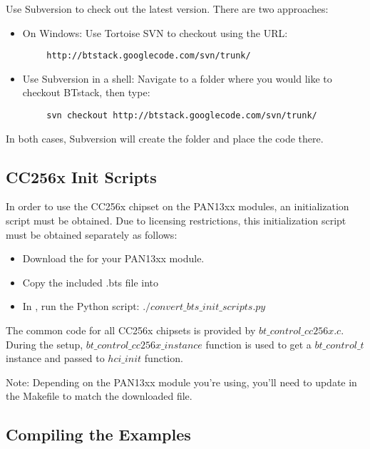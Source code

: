 Use Subversion to check out the latest version. There are two approaches:
\begin{itemize}
\item On Windows: Use Tortoise SVN to checkout using the URL:
\end{itemize}
	\begin{lstlisting}
 		http://btstack.googlecode.com/svn/trunk/
	\end{lstlisting}
\begin{itemize}
\item Use Subversion in a shell: Navigate to a folder where you would like to checkout BTstack, then type:
\end{itemize}
	\begin{lstlisting}
 		svn checkout http://btstack.googlecode.com/svn/trunk/
	\end{lstlisting}
In both cases, Subversion will create the  folder and place the code there.


\subsection{CC256x Init Scripts}

In order to use the CC256x chipset on the PAN13xx modules, an initialization script must be obtained. Due to licensing restrictions, this initialization script must be obtained separately as follows:
\begin{itemize}
\item Download the \BTSfile{} for your PAN13xx module.
\item Copy the included .bts file into 
\item In , run the Python script: $./convert\_bts\_init\_scripts.py$
\end{itemize}

The common code for all CC256x chipsets is provided by $bt\_control\_cc256x.c$. During the setup, $bt\_control\_cc256x\_instance$ function is used to get  a $bt\_control\_t$ instance and passed to $hci\_init$ function. 

Note: Depending on the PAN13xx module you're using, you'll need to update  in the Makefile to match the downloaded file.

\subsection{Compiling the Examples}

